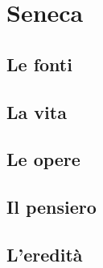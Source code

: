 \chapter{Seneca}

\section{Le fonti}

\section{La vita}

\section{Le opere}

\section{Il pensiero}

\section{L'eredità}
